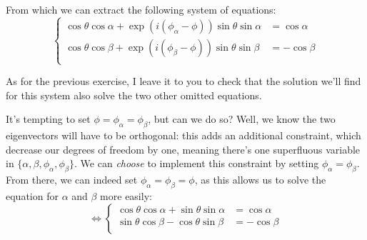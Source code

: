 \documentclass[solutions.tex]{subfiles}
\begin{document}
From which we can extract the following system of equations:
\[
	\begin{cases}
		\cos\theta\cos\alpha + \exp(i(\phi_\alpha-\phi))\sin\theta\sin\alpha
			&= \cos\alpha \\
		\cos\theta\cos\beta + \exp(i(\phi_\beta-\phi))\sin\theta\sin\beta
			&= -\cos\beta  \\
	\end{cases}
\]

\begin{remark} As for the previous exercise, I leave it to you to check
that the solution we'll find for this system also solve the two other
omitted equations.
\end{remark}

It's tempting to set $\phi=\phi_\alpha=\phi_\beta$, but can we do so?
Well, we know the two eigenvectors will have to be orthogonal: this
adds an additional constraint, which decrease our degrees of freedom by
one, meaning there's one superfluous variable in $\{\alpha, \beta, \phi_\alpha,
\phi_\beta\}$. We can \textit{choose} to implement this constraint
by setting $\phi_\alpha = \phi_\beta$. \\

From there, we can indeed set $\phi_\alpha = \phi_\beta = \phi$, as this
allows us to solve the equation for $\alpha$ and $\beta$ more easily:
\[
	\Leftrightarrow\begin{cases}
		\cos\theta\cos\alpha + \sin\theta\sin\alpha &= \cos\alpha \\
		\sin\theta\cos\beta - \cos\theta\sin\beta
			&= -\cos\beta  \\
	\end{cases}
\]
\end{document}
